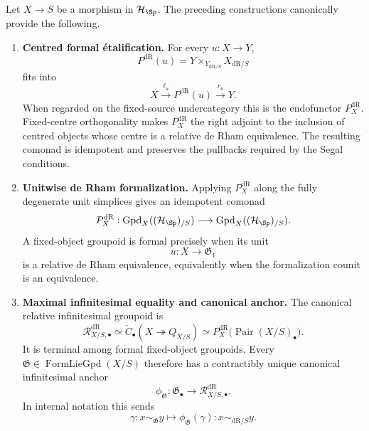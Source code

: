\begin{theorem}
\label{thm:formal-lie-groupoid-package}
Let $X\to S$ be a morphism in $\mathcal H_{\Sp}$.  The preceding
constructions canonically provide the following.
\begin{enumerate}
    \item \textbf{Centred formal \'etalification.}
    For every $u:X\to Y$,
    \[
        P^{\mathrm{dR}}(u)
        =
        Y\times_{Y_{\mathrm{dR}/S}}X_{\mathrm{dR}/S}
    \]
    fits into
    \[
        X
        \xrightarrow{\ell_u}
        P^{\mathrm{dR}}(u)
        \xrightarrow{r_u}
        Y.
    \]
    When regarded on the fixed-source undercategory this is the endofunctor
    $P_X^{\mathrm{dR}}$.  Fixed-centre orthogonality makes
    $P_X^{\mathrm{dR}}$ the right adjoint to the inclusion of centred objects whose centre
    is a relative de Rham equivalence.  The resulting comonad is idempotent
    and preserves the pullbacks required by the Segal conditions.

    \item \textbf{Unitwise de Rham formalization.}
    Applying $P_X^{\mathrm{dR}}$ along the fully degenerate unit simplices gives an
    idempotent comonad
    \[
        P_X^{\mathrm{dR}}:
        \operatorname{Gpd}_X((\mathcal H_{\Sp})_{/S})
        \longrightarrow
        \operatorname{Gpd}_X((\mathcal H_{\Sp})_{/S}).
    \]
    A fixed-object groupoid is formal precisely when its unit
    \[
        u:X\to\mathfrak G_1
    \]
    is a relative de Rham equivalence, equivalently when the formalization
    counit is an equivalence.

    \item \textbf{Maximal infinitesimal equality and canonical anchor.}
    The canonical relative infinitesimal groupoid is
    \[
        \mathcal R^{\mathrm{dR}}_{X/S,\bullet}
        \simeq
        \check C_\bullet
        \left(
            X\twoheadrightarrow Q_{X/S}
        \right)
        \simeq
        P_X^{\mathrm{dR}}\bigl(\operatorname{Pair}(X/S)_\bullet\bigr).
    \]
    It is terminal among formal fixed-object groupoids.  Every
    $\mathfrak G\in\operatorname{FormLieGpd}(X/S)$ therefore has a
    contractibly unique canonical infinitesimal anchor
    \[
        \phi_{\mathfrak G}:
        \mathfrak G_\bullet
        \longrightarrow
        \mathcal R^{\mathrm{dR}}_{X/S,\bullet}.
    \]
    In internal notation this sends
    \[
        \gamma:x\sim_{\mathfrak G}y
        \longmapsto
        \phi_{\mathfrak G}(\gamma):
        x\sim_{\mathrm{dR}/S}y.
    \]


\end{enumerate}
\end{theorem}
